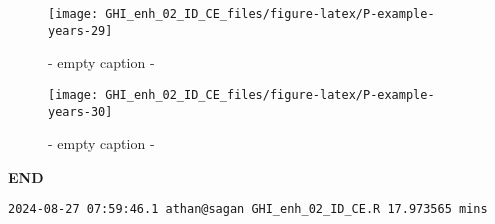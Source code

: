 \documentclass[
  10pt,
  a4paper,oneside]{article}
\begin{document}
\begin{figure}[H]

{\centering \texttt{[image: GHI\_enh\_02\_ID\_CE\_files/figure-latex/P-example-years-29]} 

}

\caption{ - empty caption - }\label{fig:P-example-years-29}
\end{figure}
\begin{figure}[H]

{\centering \texttt{[image: GHI\_enh\_02\_ID\_CE\_files/figure-latex/P-example-years-30]} 

}

\caption{ - empty caption - }\label{fig:P-example-years-30}
\end{figure}

\textbf{END}

\begin{verbatim}
2024-08-27 07:59:46.1 athan@sagan GHI_enh_02_ID_CE.R 17.973565 mins
\end{verbatim}
\end{document}
